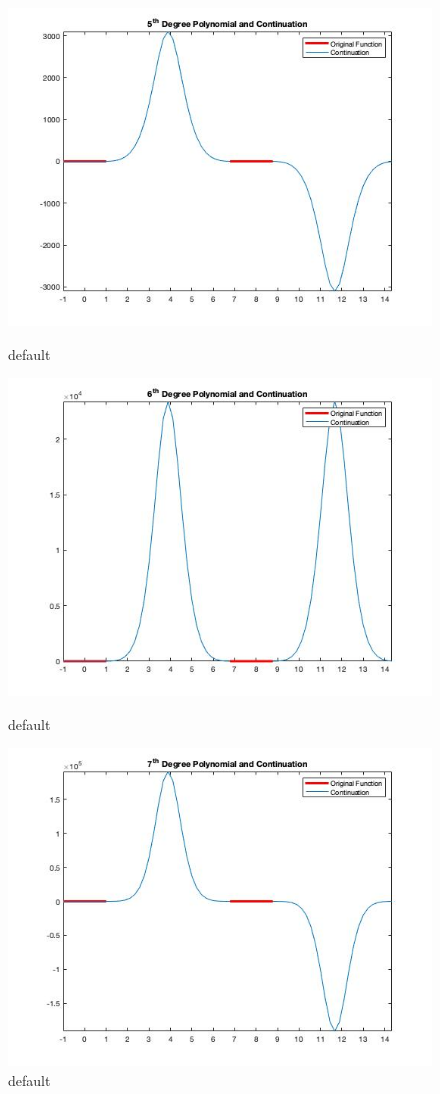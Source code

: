 \documentclass[11pt]{amsart}
\begin{document}
\begin{figure}[htbp]
\begin{center}
\includegraphics[scale=0.5]{FifthDegreeContinuation.jpg}
\caption{default}
\label{default}



\includegraphics[scale=0.5]{SixthDegreeContinuation.jpg}
\caption{default}
\label{default}



\includegraphics[scale=0.5]{SeventhDegreeContinuation.jpg}
\caption{default}
\label{default}



\end{center}
\end{figure}
\end{document}
